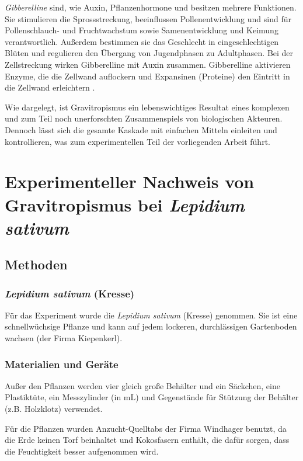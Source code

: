 \documentclass[
11pt, 
ngerman,
listof=totocnumbered,
oneside,
bibliography=totocnumbered,
abstracton
]{scrreprt}
\begin{document}
\emph{Gibberelline} sind, wie Auxin, Pflanzenhormone und besitzen mehrere Funktionen. 
Sie stimulieren die Sprossstreckung, beeinflussen Pollenentwicklung und sind für Pollenschlauch- und Fruchtwachstum sowie Samenentwicklung und Keimung verantwortlich. Außerdem bestimmen sie das Geschlecht in eingeschlechtigen Blüten und regulieren den Übergang von Jugendphasen zu Adultphasen. 
Bei der Zellstreckung wirken Gibberelline mit Auxin zusammen. Gibberelline aktivieren Enzyme, die die Zellwand auflockern und Expansinen (Proteine) den Eintritt in die Zellwand erleichtern \parencite[1122--1123]{campbell}.

 
Wie dargelegt, ist Gravitropismus ein lebenswichtiges Resultat eines komplexen und zum Teil noch unerforschten Zusammenspiels von biologischen Akteuren. Dennoch lässt sich die gesamte Kaskade mit einfachen Mitteln einleiten und kontrollieren, was zum experimentellen Teil der vorliegenden Arbeit führt. 



\chapter{Experimenteller Nachweis von Gravitropismus bei \emph{Lepidium sativum}}

\section{Methoden}

\subsection{\emph{Lepidium sativum} (Kresse)}

Für das Experiment wurde die \emph{Lepidium sativum} (Kresse) genommen. Sie ist eine schnellwüchsige Pflanze und kann auf jedem lockeren, durchlässigen Gartenboden wachsen (der Firma Kiepenkerl).


\subsection{Materialien und Geräte}

Außer den Pflanzen werden vier gleich große Behälter und ein Säckchen, eine Plastiktüte, ein Messzylinder (in mL) und Gegenstände für Stützung der Behälter (z.B. Holzklotz) verwendet.

Für die Pflanzen wurden Anzucht-Quelltabs der Firma Windhager benutzt, da die Erde keinen Torf beinhaltet und Kokosfasern enthält, die dafür sorgen, dass die Feuchtigkeit besser aufgenommen wird.
\end{document}
